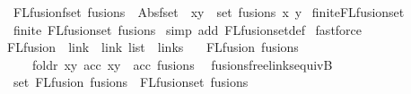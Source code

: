 \begin{isabellebody}
\ \ {\isachardoublequoteopen}FLfusion{\isacharunderscore}{\kern0pt}fset\ fusions\ {\isacharequal}{\kern0pt}{\isacharequal}{\kern0pt}\ Abs{\isacharunderscore}{\kern0pt}fset\ {\isacharparenleft}{\kern0pt}{\isasymUnion}\ {\isacharparenleft}{\kern0pt}x{\isacharcomma}{\kern0pt}y{\isacharparenright}{\kern0pt}\ {\isasymin}\ set\ fusions{\isachardot}{\kern0pt}\ {\isacharbraceleft}{\kern0pt}x{\isacharcomma}{\kern0pt}\ y{\isacharbraceright}{\kern0pt}{\isacharparenright}{\kern0pt}{\isachardoublequoteclose}\isanewline
\isanewline
\isanewline
{}\isamarkupfalse%
\ finite{\isacharunderscore}{\kern0pt}FLfusion{\isacharunderscore}{\kern0pt}set{\isacharcolon}{\kern0pt}\isanewline
\ \ {\isachardoublequoteopen}finite\ {\isacharparenleft}{\kern0pt}FLfusion{\isacharunderscore}{\kern0pt}set\ fusions{\isacharparenright}{\kern0pt}{\isachardoublequoteclose}\isanewline
%
\isadelimproof
%
\endisadelimproof
%
\isatagproof
{}\isamarkupfalse%
\ {\isacharparenleft}{\kern0pt}simp\ add{\isacharcolon}{\kern0pt}\ FLfusion{\isacharunderscore}{\kern0pt}set{\isacharunderscore}{\kern0pt}def{\isacharparenright}{\kern0pt}\isanewline
{}\isamarkupfalse%
\ fastforce%
\endisatagproof
{\isafoldproof}%
%
\isadelimproof
\isanewline
%
\endisadelimproof
\isanewline
\isanewline
\isanewline
{}\isamarkupfalse%
\ FLfusion\ {\isacharcolon}{\kern0pt}{\isacharcolon}{\kern0pt}\ {\isachardoublequoteopen}{\isacharparenleft}{\kern0pt}link\ {\isacharasterisk}{\kern0pt}\ link{\isacharparenright}{\kern0pt}\ list\ {\isacharequal}{\kern0pt}{\isachargreater}{\kern0pt}\ links{\isachardoublequoteclose}\ \isanewline
\ \ {\isachardoublequoteopen}FLfusion\ fusions\ {\isacharequal}{\kern0pt}{\isacharequal}{\kern0pt}\isanewline
\ \ \ \ \ foldr\ {\isacharparenleft}{\kern0pt}{\isasymlambda}{\isacharparenleft}{\kern0pt}x{\isacharcomma}{\kern0pt}y{\isacharparenright}{\kern0pt}\ acc{\isachardot}{\kern0pt}\ {\isacharbrackleft}{\kern0pt}x{\isacharcomma}{\kern0pt}y{\isacharbrackright}{\kern0pt}\ {\isacharat}{\kern0pt}\ acc{\isacharparenright}{\kern0pt}\ fusions\ {\isacharbrackleft}{\kern0pt}{\isacharbrackright}{\kern0pt}{\isachardoublequoteclose}\isanewline
\isanewline
\isanewline
\isanewline
\isanewline
{}\isamarkupfalse%
\ fusions{\isacharunderscore}{\kern0pt}freelinks{\isacharunderscore}{\kern0pt}equiv{}B{\isacharcolon}{\kern0pt}\isanewline
\ \ {\isachardoublequoteopen}set\ {\isacharparenleft}{\kern0pt}FLfusion\ fusions{\isacharparenright}{\kern0pt}\ {\isacharequal}{\kern0pt}\ FLfusion{\isacharunderscore}{\kern0pt}set\ fusions{\isachardoublequoteclose}\isanewline

\end{isabellebody}

